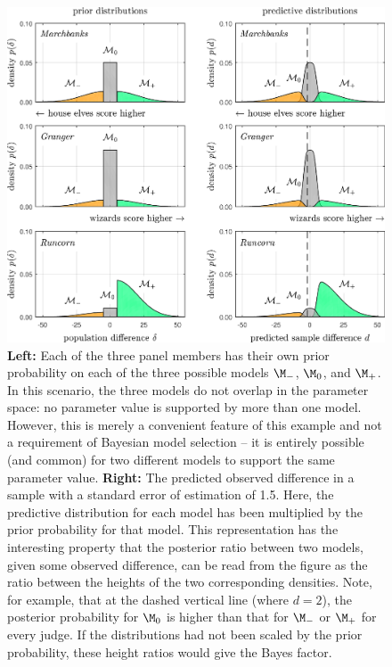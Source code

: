 \begin{figure}[p]
\centering
\includegraphics[width=\textwidth%
]{figs/bi0_etzvandekerckhove_fig6}\vspace{2ex}
\caption{\textbf{Left:} Each of the three panel members has their own prior probability on each of the three possible models $\M_-$, $\M_0$, and $\M_+$. In this scenario, the three models do not overlap in the parameter space: no parameter value is supported by more than one model. However, this is merely a convenient feature of this example and not a requirement of Bayesian model selection -- it is entirely possible (and common) for two different models to support the same parameter value. {\textbf{Right:} The predicted observed difference in a sample with a standard error of estimation of 1.5. Here, the predictive distribution for each model has been multiplied by the prior probability for that model. This representation has the interesting property that the posterior ratio between two models, given some observed difference, can be read from the figure as the ratio between the heights of the two corresponding densities. Note, for example, that at the dashed vertical line (where $d=2$), the posterior probability for $\M_0$ is higher than that for $\M_-$ or $\M_+$ for every judge.  If the distributions had not been scaled by the prior probability, these height ratios would give the Bayes factor.}}
\label{fig:bi0:elffig}
\end{figure}


